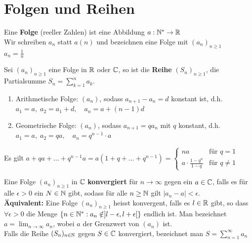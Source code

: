 \section{Folgen und Reihen}


\Def Eine \textbf{Folge} (reeller Zahlen) ist eine Abbildung $a: \mathbb{N}^{*} \rightarrow \mathbb{R} $\\
Wir schreiben $a_{n}$ statt $a(n)$ und bezeichnen eine Folge mit $(a_{n})_{n \geq 1}$\\
\Bsp $a_{n} = \frac{1}{n}$

\Def Sei $(a_{n})_{n \geq 1}$ eine Folge in $\mathbb{R} $ oder $\mathbb{C}$, so ist die \textbf{Reihe} 
$(S_{n})_{n \geq 1}$, die Partialsumme $S_n = \sum_{k=1}^{n}a_k$.



\begin{enumerate}[label=(\arabic*)]
	\item{Arithmetische Folge: \((a_n)\), sodass \(a_{n+1}-a_n=d\) konstant ist, d.h. \(a_1=a,\;a_2=a_1+d,\quad a_n=a+(n-1)d\)}
	\item{Geometrische Folge: \((a_n)\), sodass \(a_{n+1}=qa_n\) mit \(q\) konstant, d.h. \(a_1=a,\;a_2=qa,\quad a_n=q^{n-1}\cdot a\)}
\end{enumerate}

\Satz Es gilt \(a+qa+\dots+q^{n-1}a = a(1+q+\dots+q^{n-1}) = \begin{cases} na&\text{für }q=1\\ a\cdot\frac{1-q^n}{1-q}& \text{für }q\neq 1\end{cases}\)



\begin{tcolorbox}
	\Def Eine Folge $(a_n)_{n \geq 1}$ in $\mathbb{C}$ \textbf{konvergiert} für $n \rightarrow \infty$ gegen ein
	$a \in \mathbb{C}$, falls es für alle $\epsilon > 0$ ein $N \in \mathbb{N}$ gibt, sodass für alle 
	$n \geq \mathbb{N}$ gilt $|a_n-a| < \epsilon$. \\

	\textbf{Äquivalent:} Eine Folge $(a_n)_{n \geq 1}$ heisst konvergent, falls es $l \in \mathbb{R}$ gibt,
	so dass $\forall \epsilon > 0$ die Menge $\{n \in \mathbb{N}^{*}: a_{n} \notin ]l - \epsilon, l + \epsilon[\}$ endlich ist.
	Man bezeichnet $a= \lim_{n \rightarrow \infty} a_n$, wobei $a$ der Grenzwert von $(a_n)$ ist. \\

	Falls die Reihe $(S_n)_{n \in \mathbb{N}}$ gegen $S \in \mathbb{C}$ konvergiert, bezeichnet man $S=\sum_{n=1}^\infty a_n$
\end{tcolorbox}

